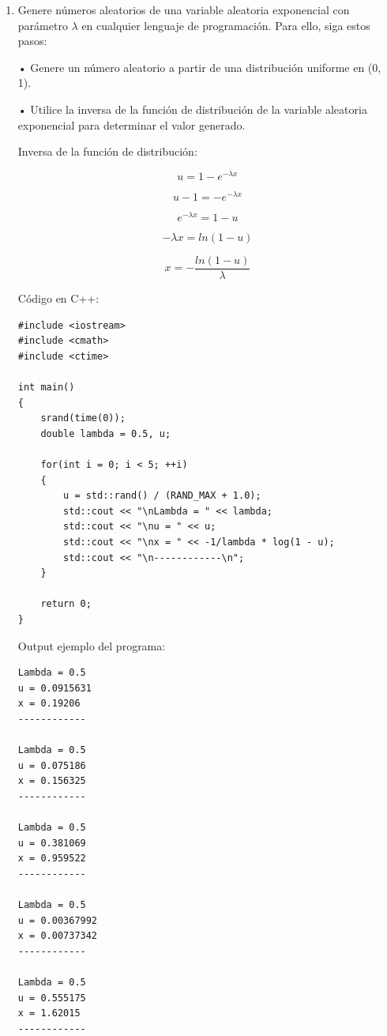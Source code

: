 \documentclass[a4paper, 12pt]{article}
\newcommand{\Aspace}{0.2cm}
\begin{document}
\begin{enumerate}
        \newpage
        \item Genere números aleatorios de una variable aleatoria exponencial con parámetro $\lambda$ en cualquier lenguaje de programación. Para ello, siga estos pasos: \par
        • Genere un número aleatorio a partir de una distribución uniforme en (0, 1). \par
        • Utilice la inversa de la función de distribución de la variable aleatoria exponencial para determinar el valor generado.
            \vspace{\Aspace} \par
            { \color{azul} 
                Inversa de la función de distribución: \par
                \[ u = 1 - e^{-\lambda x} \]    \par
                \[ u - 1 = -e^{-\lambda x} \]   \par
                \[ e^{-\lambda x} = 1 - u \]    \par
                \[ -\lambda x = ln(1 - u) \]    \par
                \[ x = -\frac{ln(1 - u)}{\lambda} \] \par
\vspace{0.5cm}
\Large Código en C++:
\begin{lstlisting}
#include <iostream>
#include <cmath>
#include <ctime>

int main()
{
    srand(time(0));
    double lambda = 0.5, u;
    
    for(int i = 0; i < 5; ++i)
    {
        u = std::rand() / (RAND_MAX + 1.0);
        std::cout << "\nLambda = " << lambda;
        std::cout << "\nu = " << u;
        std::cout << "\nx = " << -1/lambda * log(1 - u);
        std::cout << "\n------------\n";
    }

    return 0;
}
\end{lstlisting}

\newpage
\Large Output ejemplo del programa:
\begin{lstlisting}
Lambda = 0.5
u = 0.0915631
x = 0.19206
------------

Lambda = 0.5
u = 0.075186
x = 0.156325
------------

Lambda = 0.5
u = 0.381069
x = 0.959522
------------

Lambda = 0.5
u = 0.00367992
x = 0.00737342
------------

Lambda = 0.5
u = 0.555175
x = 1.62015
------------
\end{lstlisting}
            }
    \end{enumerate}
\end{document}
